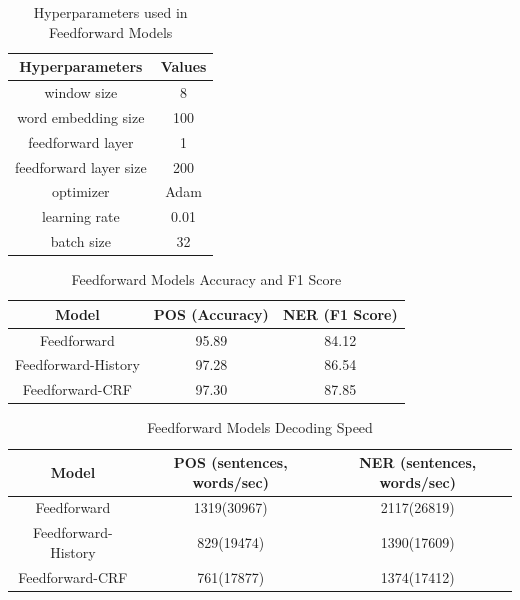 \begin{table}[]
\centering
\caption{Hyperparameters used in Feedforward Models}
\label{table:hyperparameters1}
\begin{tabular}{|c|c|}
\hline
Hyperparameters & Values \\ \hline
window size   & 8 \\ \hline
word embedding size & 100 \\ \hline
feedforward layer & 1 \\ \hline
feedforward layer size & 200 \\ \hline
optimizer & Adam \\ \hline
learning rate & 0.01 \\ \hline
batch size & 32 \\ \hline
\end{tabular}
\end{table}

\begin{table}[]
\centering
\caption{Feedforward Models Accuracy and F1 Score}
\label{table:ff-table1}
\begin{tabular}{|c|c|c|}
\hline
Model         & POS (Accuracy)  & NER (F1 Score)       \\ \hline
Feedforward    & 95.89          &   84.12     \\ \hline
Feedforward-History & 97.28     & 86.54        \\ \hline
Feedforward-CRF     & 97.30          &   87.85     \\ \hline
\end{tabular}
\end{table}

\begin{table}[]
\centering
\caption{Feedforward Models Decoding Speed}
\label{table:ff-tabel2}
\begin{tabular}{|c|c|c|}
\hline
Model       & POS  (sentences, words/sec)  & NER  (sentences, words/sec)      \\ \hline
Feedforward    & 1319(30967)     & 2117(26819)    \\ \hline
Feedforward-History & 829(19474)     & 1390(17609)     \\ \hline
Feedforward-CRF    & 761(17877)     & 1374(17412)     \\ \hline
\end{tabular}
\end{table}

